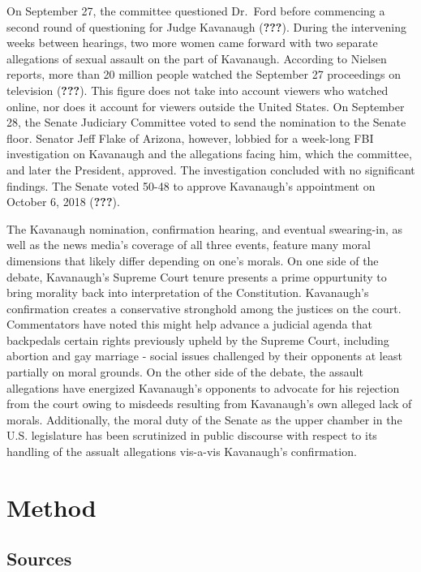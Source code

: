 \documentclass[,man]{apa6}
\theoremstyle{definition}
\theoremstyle{definition}
\theoremstyle{definition}
\theoremstyle{remark}
\begin{document}
On September 27, the committee questioned Dr.~Ford before commencing a
second round of questioning for Judge Kavanaugh ({\textbf{???}}). During
the intervening weeks between hearings, two more women came forward with
two separate allegations of sexual assault on the part of Kavanaugh.
According to Nielsen reports, more than 20 million people watched the
September 27 proceedings on television ({\textbf{???}}). This figure
does not take into account viewers who watched online, nor does it
account for viewers outside the United States. On September 28, the
Senate Judiciary Committee voted to send the nomination to the Senate
floor. Senator Jeff Flake of Arizona, however, lobbied for a week-long
FBI investigation on Kavanaugh and the allegations facing him, which the
committee, and later the President, approved. The investigation
concluded with no significant findings. The Senate voted 50-48 to
approve Kavanaugh's appointment on October 6, 2018 ({\textbf{???}}).

The Kavanaugh nomination, confirmation hearing, and eventual
swearing-in, as well as the news media's coverage of all three events,
feature many moral dimensions that likely differ depending on one's
morals. On one side of the debate, Kavanaugh's Supreme Court tenure
presents a prime oppurtunity to bring morality back into interpretation
of the Constitution. Kavanaugh's confirmation creates a conservative
stronghold among the justices on the court. Commentators have noted this
might help advance a judicial agenda that backpedals certain rights
previously upheld by the Supreme Court, including abortion and gay
marriage - social issues challenged by their opponents at least
partially on moral grounds. On the other side of the debate, the assault
allegations have energized Kavanaugh's opponents to advocate for his
rejection from the court owing to misdeeds resulting from Kavanaugh's
own alleged lack of morals. Additionally, the moral duty of the Senate
as the upper chamber in the U.S. legislature has been scrutinized in
public discourse with respect to its handling of the assualt allegations
vis-a-vis Kavanaugh's confirmation.

\hypertarget{method-1}{%
\section{Method}\label{method-1}}

\hypertarget{sources-1}{%
\subsection{Sources}\label{sources-1}}
\end{document}
